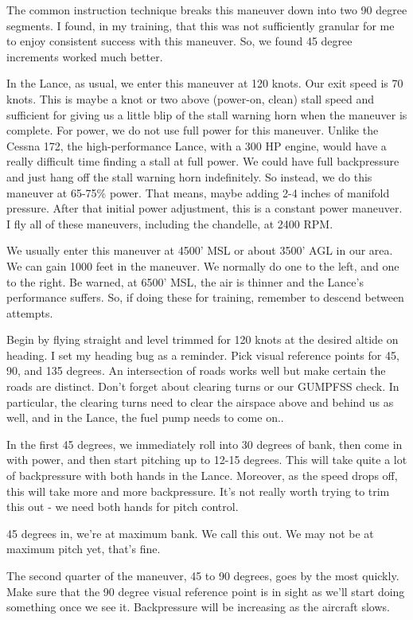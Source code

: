 The common instruction technique breaks this maneuver down into two 90 degree segments. I found, in my training, that this was not sufficiently granular for me to enjoy consistent success with this maneuver. So, we found 45 degree increments worked much better.

In the Lance, as usual, we enter this maneuver at 120 knots. Our exit speed is 70 knots. This is maybe a knot or two above (power-on, clean) stall speed and sufficient for giving us a little blip of the stall warning horn when the maneuver is complete. For power, we do not use full power for this maneuver. Unlike the Cessna 172, the high-performance Lance, with a 300 HP engine, would have a really difficult time finding a stall at full power. We could have full backpressure and just hang off the stall warning horn indefinitely. So instead, we do this maneuver at 65-75\% power. That means, maybe adding 2-4 inches of manifold pressure. After that initial power adjustment, this is a constant power maneuver. I fly all of these maneuvers, including the chandelle, at 2400 RPM.

We usually enter this maneuver at 4500' MSL or about 3500' AGL in our area. We can gain 1000 feet in the maneuver. We normally do one to the left, and one to the right. Be warned, at 6500' MSL, the air is thinner and the Lance's performance suffers. So, if doing these for training, remember to descend between attempts.

Begin by flying straight and level trimmed for 120 knots at the desired altide on heading. I set my heading bug as a reminder. Pick visual reference points for 45, 90, and 135 degrees. An intersection of roads works well but make certain the roads are distinct. Don't forget about clearing turns or our GUMPFSS check. In particular, the clearing turns need to clear the airspace above and behind us as well, and in the Lance, the fuel pump needs to come on..

In the first 45 degrees, we immediately roll into 30 degrees of bank, then come in with power, and then start pitching up to 12-15 degrees. This will take quite a lot of backpressure with both hands in the Lance. Moreover, as the speed drops off, this will take more and more backpressure. It's not really worth trying to trim this out - we need both hands for pitch control.

45 degrees in, we're at maximum bank. We call this out. We may not be at maximum pitch yet, that's fine.

The second quarter of the maneuver, 45 to 90 degrees, goes by the most quickly. Make sure that the 90 degree visual reference point is in sight as we'll start doing something once we see it. Backpressure will be increasing as the aircraft slows.

